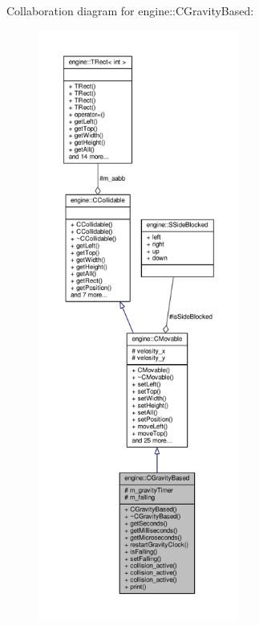 Collaboration diagram for engine\-:\-:C\-Gravity\-Based\-:
\nopagebreak
\begin{figure}[H]
\begin{center}
\leavevmode
\includegraphics[height=550pt]{classengine_1_1CGravityBased__coll__graph}
\end{center}
\end{figure}
